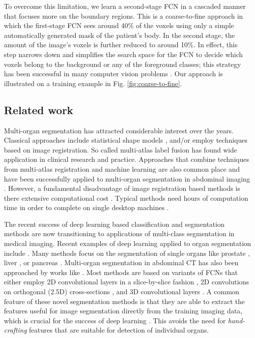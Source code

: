 \documentclass[authoryear]{elsarticle}
\begin{document}
To overcome this limitation, we learn a second-stage FCN  in a cascaded manner that focuses more on the boundary regions. This is a coarse-to-fine approach in which the first-stage FCN sees around 40\% of the voxels using only a simple automatically generated mask of the patient's body. In the second stage, the amount of the image\rq{}s voxels is further reduced to around 10\%. In effect, this step narrows down and simplifies the search space for the FCN to decide which voxels belong to the background or any of the foreground classes; this strategy has been successful in many computer vision problems \citep{viola2004robust,li2016iterative}. Our approach is illustrated on a training example in Fig. \ref{fig:coarse-to-fine}. 
\subsection{Related work}
Multi-organ segmentation has attracted considerable interest over the years. Classical approaches include statistical shape models \citep{cerrolaza2015automatic,okada2015abdominal}, and/or employ techniques based on image registration. So called multi-atlas label fusion \citep{rohlfing2004evaluation,wang2013multi,iglesias2015multi} has found wide application in clinical research and practice. Approaches that combine techniques from multi-atlas registration and machine learning are also common place and have been successfully applied to multi-organ segmentation in abdominal imaging \citep{tong2015discriminative,oda2016regression}.  However, a fundamental disadvantage of image registration based methods is there extensive computational cost \citep{iglesias2015multi}. Typical methods need hours of computation time in order to complete on single desktop machines \citep{wolz2013automated}.

The recent success of deep learning based classification and segmentation methods are now transitioning to applications of multi-class segmentation in medical imaging. Recent examples of deep learning applied to organ segmentation include \citep{roth2017spatial,zhou2016pancreas,christ2016automatic,zhou2016three}. Many methods focus on the segmentation of single organs like prostate \citep{milletari2016v}, liver \citep{christ2016automatic}, or pancreas \citep{roth2015deeporgan,roth2016spatial}. Multi-organ segmentation in abdominal CT has also been approached by works like \citep{hu2017automatic,gibson2017towards}. Most methods are based on variants of FCNs \citep{long2015fully} that either employ 2D convolutional layers in a slice-by-slice fashion \cite{roth2016spatial,zhou2016pancreas,christ2016automatic,zhou2016three}, 2D convolutions on orthogonal (2.5D) cross-sections  \citep{roth2015deeporgan,prasoon2013deep}, and 3D convolutional layers \citep{milletari2016v,chen2016voxresnet,dou20173d,kamnitsas2017efficient}. A common feature of these novel segmentation methods is that they are able to extract the features useful for image segmentation directly from the training imaging data, which is crucial for the success of deep learning \citep{lecun2015deep}. This avoids the need for \textit{hand-crafting} features that are suitable for detection of individual organs.
\end{document}
